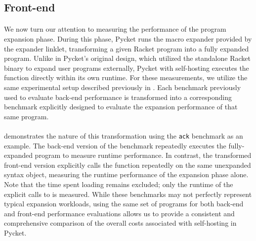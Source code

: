 		\subsection{Front-end}

			\paragraph{}%
				We now turn our attention to measuring the performance of the program expansion phase. During this phase, Pycket runs the macro expander provided by the expander linklet, transforming a given Racket program into a fully expanded  program. Unlike in Pycket's original design, which utilized the standalone Racket binary to expand user programs externally, Pycket with self-hosting executes the  function directly within its own runtime. For these measurements, we utilize the same experimental setup described previously in . Each benchmark previously used to evaluate back-end performance is transformed into a corresponding benchmark explicitly designed to evaluate the expansion performance of that same program.


			\paragraph{}%
				 demonstrates the nature of this transformation using the \texttt{ack} benchmark as an example. The back-end version of the benchmark repeatedly executes the fully-expanded program to measure runtime performance. In contrast, the transformed front-end version explicitly calls the  function repeatedly on the same unexpanded syntax object, measuring the runtime performance of the expansion phase alone. Note that the time spent loading  remains excluded; only the runtime of the explicit calls to  is measured. While these benchmarks may not perfectly represent typical expansion workloads, using the same set of programs for both back-end and front-end performance evaluations allows us to provide a consistent and comprehensive comparison of the overall costs associated with self-hosting in Pycket.


